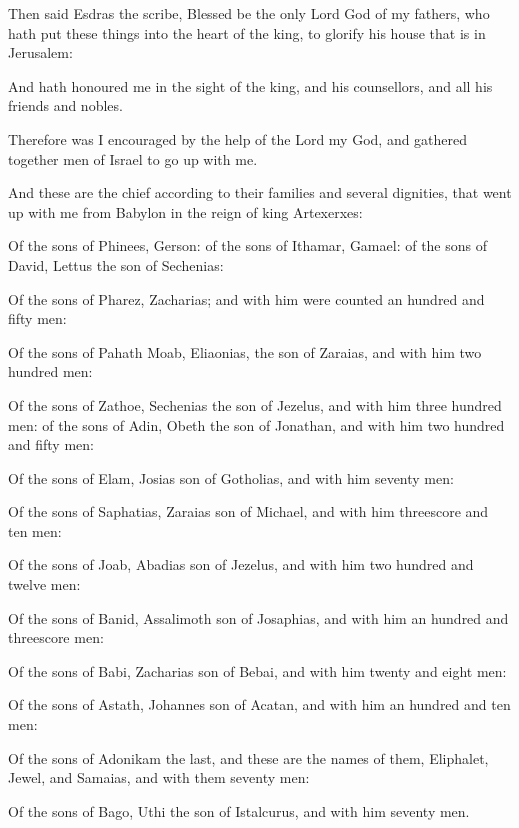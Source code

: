 {\par }{\PP {}Then said Esdras the scribe, Blessed be the only Lord God of my fathers, who hath put these things into the heart of the king, to glorify his house that is in Jerusalem:
\par }{\PP {}And hath honoured me in the sight of the king, and his counsellors, and all his friends and nobles.
\par }{\PP {}Therefore was I encouraged by the help of the Lord my God, and gathered together men of Israel to go up with me.
\par }{\PP {}And these are the chief according to their families and several dignities, that went up with me from Babylon in the reign of king Artexerxes:
\par }{\PP {}Of the sons of Phinees, Gerson: of the sons of Ithamar, Gamael: of the sons of David, Lettus the son of Sechenias:
\par }{\PP {}Of the sons of Pharez, Zacharias; and with him were counted an hundred and fifty men:
\par }{\PP {}Of the sons of Pahath Moab, Eliaonias, the son of Zaraias, and with him two hundred men:
\par }{\PP {}Of the sons of Zathoe, Sechenias the son of Jezelus, and with him three hundred men: of the sons of Adin, Obeth the son of Jonathan, and with him two hundred and fifty men:
\par }{\PP {}Of the sons of Elam, Josias son of Gotholias, and with him seventy men:
\par }{\PP {}Of the sons of Saphatias, Zaraias son of Michael, and with him threescore and ten men:
\par }{\PP {}Of the sons of Joab, Abadias son of Jezelus, and with him two hundred and twelve men:
\par }{\PP {}Of the sons of Banid, Assalimoth son of Josaphias, and with him an hundred and threescore men:
\par }{\PP {}Of the sons of Babi, Zacharias son of Bebai, and with him twenty and eight men:
\par }{\PP {}Of the sons of Astath, Johannes son of Acatan, and with him an hundred and ten men:
\par }{\PP {}Of the sons of Adonikam the last, and these are the names of them, Eliphalet, Jewel, and Samaias, and with them seventy men:
\par }{\PP {}Of the sons of Bago, Uthi the son of Istalcurus, and with him seventy men.
}
